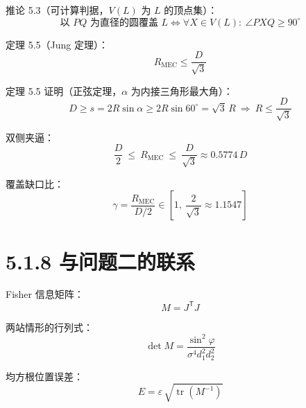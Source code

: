 \documentclass[11pt]{ctexart}
\begin{document}
推论 5.3（可计算判据，$V(L)$ 为 $L$ 的顶点集）：
\begin{equation}
\text{以 } PQ \text{ 为直径的圆覆盖 } L
\iff \forall X \in V(L):\ \angle PXQ \ge 90^\circ
\end{equation}

定理 5.5（Jung 定理）：
\begin{equation}
R_{\mathrm{MEC}} \le \frac{D}{\sqrt{3}}
\end{equation}

定理 5.5 证明（正弦定理，$\alpha$ 为内接三角形最大角）：
\begin{equation}
D \ge s = 2R\sin\alpha \ge 2R\sin 60^\circ = \sqrt{3}\,R
\ \Longrightarrow\ R \le \frac{D}{\sqrt{3}}
\end{equation}

双侧夹逼：
\begin{equation}
\frac{D}{2} \ \le\ R_{\mathrm{MEC}}\ \le\ \frac{D}{\sqrt{3}} \approx 0.5774\,D
\end{equation}

覆盖缺口比：
\begin{equation}
\gamma = \frac{R_{\mathrm{MEC}}}{D/2} \in \left[1,\ \frac{2}{\sqrt{3}} \approx 1.1547\right]
\end{equation}

\section*{5.1.8 与问题二的联系}

Fisher 信息矩阵：
\begin{equation}
M = J^{\mathsf{T}}J
\end{equation}

两站情形的行列式：
\begin{equation}
\det M = \frac{\sin^2\varphi}{\sigma^4 d_1^2 d_2^2}
\end{equation}

均方根位置误差：
\begin{equation}
E = \varepsilon\,\sqrt{\operatorname{tr}(M^{-1})}
\end{equation}
\end{document}
